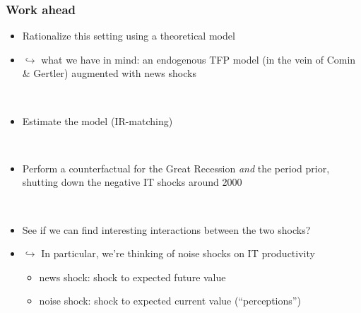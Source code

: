 \documentclass{beamer}
\begin{document}
\begin{frame}
	\frametitle{Work ahead}
	
\begin{itemize}
\item Rationalize this setting using a theoretical model
\item [] $\hookrightarrow$ what we have in mind: an endogenous TFP model (in the vein of Comin \& Gertler) augmented with news shocks 

\

\item Estimate the model (IR-matching)

\

\item Perform a counterfactual for the Great Recession \emph{and} the period prior, shutting down the negative IT shocks around 2000

\

\item See if we can find interesting interactions between the two shocks?
\item [] $\hookrightarrow$ In particular, we're thinking of noise shocks on IT productivity
	\begin{itemize}
	\item [] news shock: shock to expected future value
	\item [] noise shock: shock to expected current value (``perceptions'')
	\end{itemize}
\end{itemize}


   		 	
\end{frame}





\end{document}
